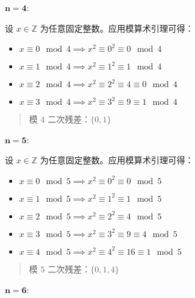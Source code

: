 \begin{example}[二次残差]
    $\mathbf{n=4}$: 

    设 $x \in \mathbb{Z}$ 为任意固定整数。应用模算术引理可得：
    \begin{itemize}
        \item $x \equiv 0 \mod 4 \implies x^2 \equiv 0^2 \equiv 0 \mod 4$
        \item $x \equiv 1 \mod 4 \implies x^2 \equiv 1^2 \equiv 1 \mod 4$
        \item $x \equiv 2 \mod 4 \implies x^2 \equiv 2^2 \equiv 4 \equiv 0 \mod 4$
        \item $x \equiv 3 \mod 4 \implies x^2 \equiv 3^2 \equiv 9 \equiv 1 \mod 4$
    \end{itemize}
    \begin{quotation}
        \begin{center}
            \large 模 $4$ 二次残差：$\{0, 1\}$
        \end{center}
    \end{quotation}

    $\mathbf{n=5}$: 

    设 $x \in \mathbb{Z}$ 为任意固定整数。应用模算术引理可得：
    \begin{itemize}
        \item $x \equiv 0 \mod 5 \implies x^2 \equiv 0^2 \equiv 0 \mod 5$
        \item $x \equiv 1 \mod 5 \implies x^2 \equiv 1^2 \equiv 1 \mod 5$
        \item $x \equiv 2 \mod 5 \implies x^2 \equiv 2^2 \equiv 4 \mod 5$
        \item $x \equiv 3 \mod 5 \implies x^2 \equiv 3^2 \equiv 9 \equiv 4 \mod 5$
        \item $x \equiv 4 \mod 5 \implies x^2 \equiv 4^2 \equiv 16 \equiv 1 \mod 5$
    \end{itemize}
    \begin{quotation}
        \begin{center}
            \large 模 $5$ 二次残差：$\{0, 1, 4\}$
        \end{center}
    \end{quotation}

    $\mathbf{n=6}$: 


\end{example}
